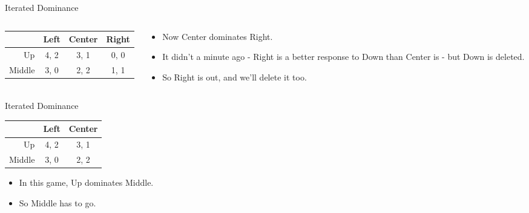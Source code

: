 \documentclass[
  14pt,
  letterpaper,
  ignorenonframetext,
  aspectratio=169,
  handout]{beamer}
\providecommand{\tightlist}{%
  \setlength{\itemsep}{0pt}\setlength{\parskip}{0pt}}\usepackage{longtable,booktabs,array}
\let\olditem\item
\renewcommand{\item}{%
\olditem\vspace{6pt}}
\begin{document}
\begin{frame}{Iterated Dominance}
\protect\hypertarget{iterated-dominance-3}{}
\begin{columns}[T]
\begin{column}{0.5\textwidth}
\begin{table}[!h]
\centering
\begin{tabular}[t]{>{}r|ccc}
\toprule
 & Left & Center & Right\\
\midrule
Up & 4, 2 & 3, 1 & 0, 0\\
Middle & 3, 0 & 2, 2 & 1, 1\\
\bottomrule
\end{tabular}
\end{table}
\end{column}

\begin{column}{0.5\textwidth}
\begin{itemize}[<+->]
\tightlist
\item
  Now Center dominates Right.
\item
  It didn't a minute ago - Right is a better response to Down than
  Center is - but Down is deleted.
\item
  So Right is out, and we'll delete it too.
\end{itemize}
\end{column}
\end{columns}
\end{frame}

\begin{frame}{Iterated Dominance}
\protect\hypertarget{iterated-dominance-4}{}
\begin{table}[!h]
\centering
\begin{tabular}[t]{>{}r|cc}
\toprule
 & Left & Center\\
\midrule
Up & 4, 2 & 3, 1\\
Middle & 3, 0 & 2, 2\\
\bottomrule
\end{tabular}
\end{table}

\begin{itemize}[<+->]
\tightlist
\item
  In this game, Up dominates Middle.
\item
  So Middle has to go.
\end{itemize}
\end{frame}
\end{document}
